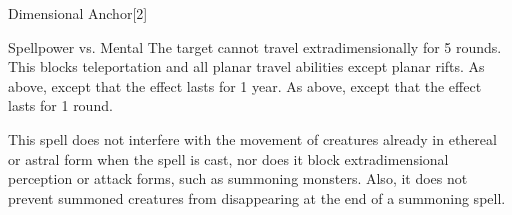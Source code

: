 \begin{spellsection}{Dimensional Anchor}[2]
    \begin{spellheader}
    \end{spellheader}
    \begin{spellcontent}
        \begin{spelltargetinginfo}
        \end{spelltargetinginfo}
        \begin{spelleffects}
            \begin{spellattack}{Spellpower vs. Mental}
                \spellsuccess  The target cannot travel extradimensionally for 5 rounds. This blocks teleportation and all planar travel abilities except planar rifts.
                \spellcritical As above, except that the effect lasts for 1 year.
                \spellfailure As above, except that the effect lasts for 1 round.
            \end{spellattack}
        \end{spelleffects}
    \end{spellcontent}
    \begin{spellfooter}
        \spellnotes This spell does not interfere with the movement of creatures already in ethereal or astral form when the spell is cast, nor does it block extradimensional perception or attack forms, such as summoning monsters. Also, it does not prevent summoned creatures from disappearing at the end of a summoning spell.
        \miscastrandom
    \end{spellfooter}
    \begin{spellaugments}
    \end{spellaugments}
\end{spellsection}

